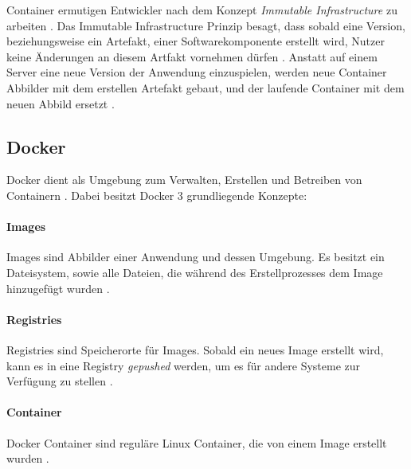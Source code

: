 Container ermutigen Entwickler nach dem Konzept \emph{Immutable Infrastructure} zu arbeiten \cite{Burns2019}.
Das Immutable Infrastructure Prinzip besagt, dass sobald eine Version, beziehungsweise ein Artefakt, einer Softwarekomponente erstellt wird,
Nutzer keine Änderungen an diesem Artfakt vornehmen dürfen \cite{Burns2019}. 
Anstatt auf einem Server eine neue Version der Anwendung einzuspielen, werden neue Container Abbilder mit dem erstellen Artefakt gebaut, 
und der laufende Container mit dem neuen Abbild ersetzt \cite{Burns2019}.

\subsection{Docker}
Docker dient als Umgebung zum Verwalten, Erstellen und Betreiben von Containern \cite{Marko2018}.
Dabei besitzt Docker 3 grundliegende Konzepte:

\paragraph{Images}
Images sind Abbilder einer Anwendung und dessen Umgebung.
Es besitzt ein Dateisystem, sowie alle Dateien, die während des Erstellprozesses dem Image hinzugefügt wurden \cite{Marko2018}.

\paragraph{Registries}
Registries sind Speicherorte für Images. Sobald ein neues Image erstellt wird, kann es in eine Registry \emph{gepushed} werden,
um es für andere Systeme zur Verfügung zu stellen \cite{Marko2018}.

\paragraph{Container}
Docker Container sind reguläre Linux Container, die von einem Image erstellt wurden \cite{Marko2018}.
